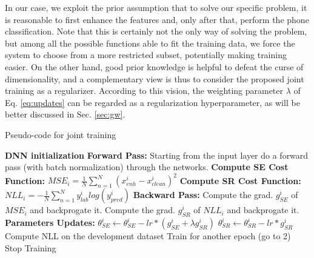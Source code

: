 \documentclass{article}
\begin{document}
In our case, we exploit the prior assumption that to solve our specific problem, it is reasonable to first enhance the features and, only after that, perform the phone classification.
Note that this is certainly not the only way of solving the problem, but among all the possible functions able to fit the training data, we force the system to choose from a more restricted subset, potentially making training easier. %
On the other hand, good prior knowledge is helpful to defeat the curse of dimensionality, and %
a complementary view is thus to consider the proposed joint training as a regularizer. %
According to this vision, the weighting parameter $\lambda$ of Eq. \ref{eq:updates} can be regarded as a regularization hyperparameter, as will be better discussed in Sec. \ref{sec:gw}. %
\begin{algorithm}[t!]
\caption{Pseudo-code for joint training}
\label{alg}
\begin{algorithmic}[1]
\State \textbf{DNN initialization} 
 \State \textbf{Forward Pass:} 
 \State Starting from the input layer do a forward pass
 \State (with batch normalization) through the networks.
  \State \textbf{Compute SE Cost Function:} 
  \State $MSE_i=\frac{1}{N}\sum_{n=1}^{N}(x_{enh}^i-x_{clean}^i)^2$
  \State \textbf{Compute SR Cost Function:}
  \State $NLL_i=-\frac{1}{N}\sum_{n=1}^{N}y_{lab}^i log(y_{pred}^i)$ 
  \State \textbf{Backward Pass:}
  \State Compute the grad. $g_{SE}^i$ of $MSE_i$ and backprogate it.
  \State Compute the grad. $g_{SR}^i$ of $NLL_i$ and backprogate it.
  \State \textbf{Parameters Updates:}
   \State  $\theta_{SE}^i \gets \theta_{SE}^i - lr * (g_{SE}^i+\lambda g_{SR}^i)$
    \State  $\theta_{SR}^i \gets \theta_{SR}^i - lr * g_{SR}^i$
\EndFor
\State Compute NLL on the development dataset
  \State Train for another epoch (go to 2) 
\Else
 \State Stop Training
\EndIf
\end{algorithmic}
\end{algorithm}
\end{document}
